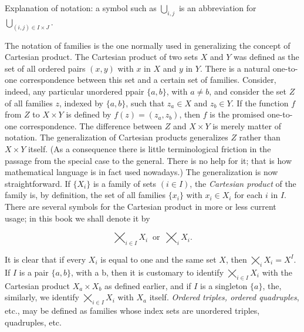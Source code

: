 Explanation of notation: a symbol such as $\bigcup_{i,j}$ is an abbreviation for $\bigcup_{(i,j) \in I \times J}$.

The notation of families is the one normally used in generalizing the concept of Cartesian product. The Cartesian product of two sets $X$ and $Y$ was defined as the set of all ordered pairs $(x, y)$ with $x$ in $X$ and $y$ in $Y$. There is a natural one-to-one correspondence between this set and a certain set of families. Consider, indeed, any  particular unordered ppair $\{ a,b \}$, with $a \neq b$, and consider the set $Z$ of all families $z$, indexed by $\{ a,b \}$, such that $ z_{a} \in X$ and $z_{b} \in Y$. If the function $f$ from $Z$ to $X \times Y$ is defined by $f(z) = (z_{a}, z_{b})$, then $f$ is the promised one-to-one correspondence. The difference between $Z$ and $X \times Y$ is merely matter of notation. The generalization of Cartesian products generalizes $Z$ rather than $X \times Y$ itself. (As a consequence there is little terminological friction in the passage from the special case to the general. There is no help for it; that is how mathematical language is in fact used nowadays.) The generalization is now straightforward. If $\{ X_{i} \}$ is a family of sets $(i \in I)$, the \textit{Cartesian product} of the family is, by definition, the set of all families $\{ x_{i} \}$ with $x_{i} \in X_{i}$ for each $i$ in $I$. There are several symbols for the Cartesian product in more or less current usage; in this book we shall denote it by 

\begin{equation*}
\bigtimes_{i \in I}X_{i} \: \text{ or } \: \bigtimes_{i}X_{i}.
\end{equation*}

It is clear that if every $X_{i}$ is equal to one and the same set $X$, then $\bigtimes_{i}X_{i} = X^{I}$. If $I$ is a pair $\{ a,b \}$, with a \neq b, then it is customary to identify $\bigtimes_{i \in I}X_{i}$ with the Cartesian product $X_{a} \times X_{b}$ as defined earlier, and if $I$ is a singleton $\{ a \}$, the, similarly, we identify $\bigtimes_{i \in I}X_{i}$ with $X_{a}$ itself. \textit{Ordered triples, ordered quadruples}, etc., may be defined as families whose index sets are unordered triples, quadruples, etc. 

